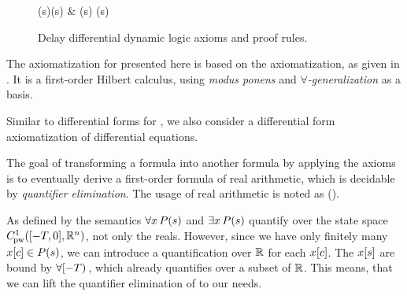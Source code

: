 \begin{figure}[t]
\begin{calculuscollections}{\textwidth}
\begin{calculus}
{{                    \asfml(s)\limply\bsfml(s) & \asfml(s)
                }{
                    \bsfml(s)
                }
            }{}
        \end{calculus}
        \end{calculuscollections}
        \caption{Delay differential dynamic logic axioms and proof rules.}
        \label{fig:axioms}
    \end{figure}


    The axiomatization for \ddL presented here is based on the \dL axiomatization, as given in \cite{Platzer12Complete}.
    It is a first-order Hilbert calculus, using \emph{modus ponens} and \emph{$\forall$-generalization} as a basis.



    Similar to differential forms for \dL \cite{Platzer15Uniform}, we also consider a differential form axiomatization of differential equations.

    The goal of transforming a \ddL formula into another formula by applying the axioms is to eventually derive a first-order formula of real arithmetic, which is decidable by \emph{quantifier elimination}. The usage of real arithmetic is noted as ().

    As defined by the semantics $\forall x{\,} P(s)$ and $\exists x{\,} P(s)$ quantify over the state space $\statespace$, not only the reals.
    However, since we have only finitely many $x[c]\in P(s)$, we can introduce a quantification over $\mathbb{R}$ for each $x[c]$. The $x[s]$ are bound by $\forall [-T){\,}$, which already quantifies over a subset of $\mathbb{R}$.
    This means, that we can lift the quantifier elimination of \FOLR to our needs.

